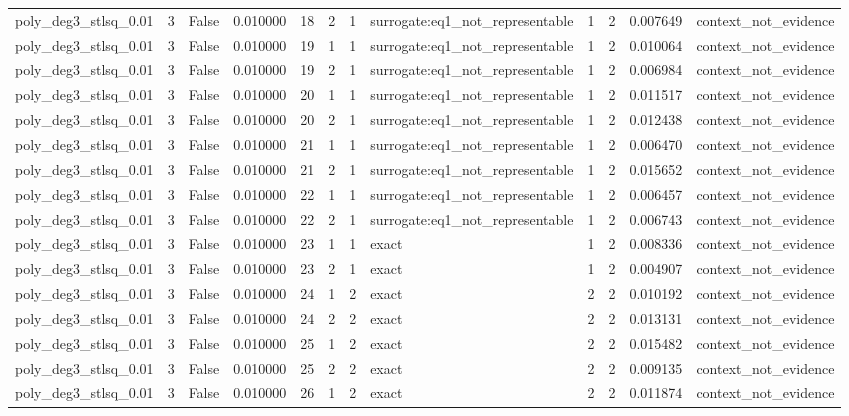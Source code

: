 \begin{tabular}{lrrrrrrlrrrl}
poly\_deg3\_stlsq\_0.01 & 3 & False & 0.010000 & 18 & 2 & 1 & surrogate:eq1\_not\_representable & 1 & 2 & 0.007649 & context\_not\_evidence \\
poly\_deg3\_stlsq\_0.01 & 3 & False & 0.010000 & 19 & 1 & 1 & surrogate:eq1\_not\_representable & 1 & 2 & 0.010064 & context\_not\_evidence \\
poly\_deg3\_stlsq\_0.01 & 3 & False & 0.010000 & 19 & 2 & 1 & surrogate:eq1\_not\_representable & 1 & 2 & 0.006984 & context\_not\_evidence \\
poly\_deg3\_stlsq\_0.01 & 3 & False & 0.010000 & 20 & 1 & 1 & surrogate:eq1\_not\_representable & 1 & 2 & 0.011517 & context\_not\_evidence \\
poly\_deg3\_stlsq\_0.01 & 3 & False & 0.010000 & 20 & 2 & 1 & surrogate:eq1\_not\_representable & 1 & 2 & 0.012438 & context\_not\_evidence \\
poly\_deg3\_stlsq\_0.01 & 3 & False & 0.010000 & 21 & 1 & 1 & surrogate:eq1\_not\_representable & 1 & 2 & 0.006470 & context\_not\_evidence \\
poly\_deg3\_stlsq\_0.01 & 3 & False & 0.010000 & 21 & 2 & 1 & surrogate:eq1\_not\_representable & 1 & 2 & 0.015652 & context\_not\_evidence \\
poly\_deg3\_stlsq\_0.01 & 3 & False & 0.010000 & 22 & 1 & 1 & surrogate:eq1\_not\_representable & 1 & 2 & 0.006457 & context\_not\_evidence \\
poly\_deg3\_stlsq\_0.01 & 3 & False & 0.010000 & 22 & 2 & 1 & surrogate:eq1\_not\_representable & 1 & 2 & 0.006743 & context\_not\_evidence \\
poly\_deg3\_stlsq\_0.01 & 3 & False & 0.010000 & 23 & 1 & 1 & exact & 1 & 2 & 0.008336 & context\_not\_evidence \\
poly\_deg3\_stlsq\_0.01 & 3 & False & 0.010000 & 23 & 2 & 1 & exact & 1 & 2 & 0.004907 & context\_not\_evidence \\
poly\_deg3\_stlsq\_0.01 & 3 & False & 0.010000 & 24 & 1 & 2 & exact & 2 & 2 & 0.010192 & context\_not\_evidence \\
poly\_deg3\_stlsq\_0.01 & 3 & False & 0.010000 & 24 & 2 & 2 & exact & 2 & 2 & 0.013131 & context\_not\_evidence \\
poly\_deg3\_stlsq\_0.01 & 3 & False & 0.010000 & 25 & 1 & 2 & exact & 2 & 2 & 0.015482 & context\_not\_evidence \\
poly\_deg3\_stlsq\_0.01 & 3 & False & 0.010000 & 25 & 2 & 2 & exact & 2 & 2 & 0.009135 & context\_not\_evidence \\
poly\_deg3\_stlsq\_0.01 & 3 & False & 0.010000 & 26 & 1 & 2 & exact & 2 & 2 & 0.011874 & context\_not\_evidence \\

\end{tabular}
